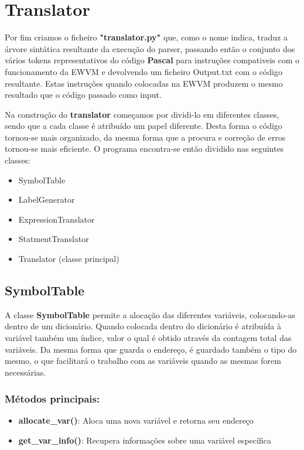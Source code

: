 \chapter{Translator}

Por fim criamos o ficheiro \textbf{"translator.py"} que, como o  nome indica, traduz a árvore sintática  resultante da execução do parser, passando então o conjunto dos vários tokens representativos do código \textbf{Pascal} para instruções compativeis com o funcionamento da EWVM e devolvendo um ficheiro Output.txt com o código resultante. Estas instruções quando colocadas na EWVM produzem o mesmo resultado que o código passado como input.

Na construção do \textbf{translator} começamos por dividi-lo em diferentes classes, sendo que a cada classe é atribuído um papel diferente. Desta forma o código tornou-se mais organizado, da mesma forma que a procura e correção de erros tornou-se mais eficiente.
O programa encontra-se  então dividido nas seguintes classes:

\begin{itemize}
    \item SymbolTable
    \item LabelGenerator
    \item ExpressionTranslator
    \item StatmentTranslator
    \item Translator (classe principal)
\end{itemize}

\newpage

\section{SymbolTable}

A classe \textbf{SymbolTable} permite a alocação das diferentes variáveis, colocando-as dentro de um dicionário. Quando colocada dentro do dicionário é atribuída à variável também um índice, valor o qual é obtido através da contagem total das variáveis. Da mesma forma que  guarda o endereço, é  guardado também o tipo do mesmo, o que facilitará o trabalho com as variáveis quando as mesmas forem necessárias.

\paragraph{}

\subsection{Métodos principais:}
\begin{itemize}
    \item \textbf{allocate\_var()}: Aloca uma nova variável e retorna seu endereço
    \item \textbf{get\_var\_info()}: Recupera informações sobre uma variável específica
\end{itemize}


